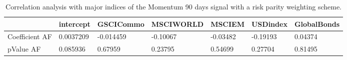 \begin{table}[H]
\centering
\begin{tabular}{lllllll}
& intercept & GSCICommo & MSCIWORLD & MSCIEM & USDindex & GlobalBonds \\ 
\hline 
Coefficient AF & 0.0037209 & -0.014459 & -0.10067 & -0.03482 & -0.19193 & 0.04374 \\ 
pValue AF & 0.085936 & 0.67959 & 0.23795 & 0.54699 & 0.27704 & 0.81495 \\ 
\hline
\end{tabular}
\caption{Correlation analysis with major indices of the Momentum 90 days signal with a risk parity weighting scheme.}
\label{MOM90RP_AFACTOR}
\end{table}